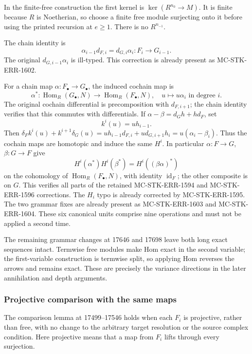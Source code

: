 In the finite-free construction the first kernel is \(\ker(R^{n_0}\to M)\). It is finite because \(R\) is Noetherian, so choose a finite free module surjecting onto it before using the printed recursion at \(e\geq1\). There is no \(R^{n_{-1}}\).

The chain identity is \[
\alpha_{i-1}d_{F,i}=d_{G,i}\alpha_i:F_i\longrightarrow G_{i-1}.
\] The original \(d_{G,i-1}\alpha_i\) is ill-typed. This correction is already present as MC-STK-ERR-1602.

For a chain map \(\alpha:F_\bullet\to G_\bullet\), the induced cochain map is \[
\alpha^*:\operatorname{Hom}_R(G_\bullet,N)
\longrightarrow\operatorname{Hom}_R(F_\bullet,N),\quad
u\longmapsto u\alpha_i\text{ in degree }i.
\] The original cochain differential is precomposition with \(d_{F,i+1}\); the chain identity verifies that this commutes with differentials. If \(\alpha-\beta=d_Gh+hd_F\), set \[
k^i(u)=u h_{i-1}.
\] Then \(\delta_F k^i(u)+k^{i+1}\delta_G(u)
=u h_{i-1}d_{F,i}+u d_{G,i+1}h_i=u(\alpha_i-\beta_i)\). Thus the cochain maps are homotopic and induce the same \(H^i\). In particular \(\alpha:F\to G\), \(\beta:G\to F\) give \[
H^i(\alpha^*)H^i(\beta^*)=H^i((\beta\alpha)^*)
\] on the cohomology of \(\operatorname{Hom}_R(F_\bullet,N)\), with identity \(\operatorname{id}_F\); the other composite is on \(G\). This verifies all parts of the retained MC-STK-ERR-1594 and MC-STK-ERR-1596 corrections. The \(H_i\) typo is already corrected by MC-STK-ERR-1595. The two grammar fixes are already present as MC-STK-ERR-1603 and MC-STK-ERR-1604. These six canonical units comprise nine operations and must not be applied a second time.

The remaining grammar changes at 17646 and 17698 leave both long exact sequences intact. Termwise free modules make Hom exact in the second variable; the first-variable construction is termwise split, so applying Hom reverses the arrows and remains exact. These are precisely the variance directions in the later annihilation and depth arguments.

\subsubsection{Projective comparison with the same maps}\label{algebra-proof-007-projective-comparison-with-the-same-maps}

The comparison lemma at 17499--17546 holds when each \(F_i\) is projective, rather than free, with no change to the arbitrary target resolution or the source complex condition. Here projective means that a map from \(F_i\) lifts through every surjection.

